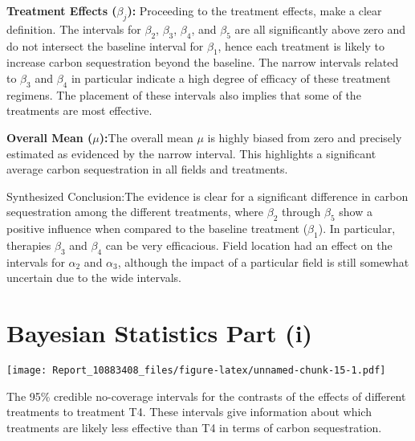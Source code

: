 \documentclass[
]{article}
\begin{document}
\textbf{Treatment Effects (\(\beta_j\)):} Proceeding to the treatment
effects, make a clear definition. The intervals for \(\beta_2\),
\(\beta_3\), \(\beta_4\), and \(\beta_5\) are all significantly above
zero and do not intersect the baseline interval for \(\beta_1\), hence
each treatment is likely to increase carbon sequestration beyond the
baseline. The narrow intervals related to \(\beta_3\) and \(\beta_4\) in
particular indicate a high degree of efficacy of these treatment
regimens. The placement of these intervals also implies that some of the
treatments are most effective.

\textbf{Overall Mean (\(\mu\)):}The overall mean \(\mu\) is highly
biased from zero and precisely estimated as evidenced by the narrow
interval. This highlights a significant average carbon sequestration in
all fields and treatments.

Synthesized Conclusion:The evidence is clear for a significant
difference in carbon sequestration among the different treatments, where
\(\beta_2\) through \(\beta_5\) show a positive influence when compared
to the baseline treatment (\(\beta_1\)). In particular, therapies
\(\beta_3\) and \(\beta_4\) can be very efficacious. Field location had
an effect on the intervals for \(\alpha_2\) and \(\alpha_3\), although
the impact of a particular field is still somewhat uncertain due to the
wide intervals.

\section{Bayesian Statistics Part (i)}\label{bayesian-statistics-part-i}

\texttt{[image: Report\_10883408\_files/figure-latex/unnamed-chunk-15-1.pdf]}

The 95\% credible no-coverage intervals for the contrasts of the effects
of different treatments to treatment T4. These intervals give
information about which treatments are likely less effective than T4 in
terms of carbon sequestration.
\end{document}
